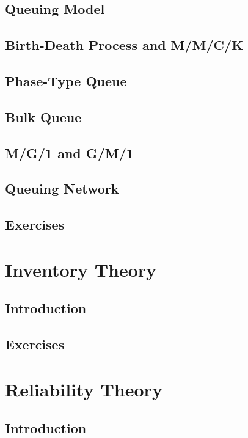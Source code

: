 \documentclass[10pt]{book}
\begin{document}
	\chapter{Queuing Model}

	\chapter{Birth-Death Process and M/M/C/K}

	\chapter{Phase-Type Queue}

	\chapter{Bulk Queue}

	\chapter{M/G/1 and G/M/1}

	\chapter{Queuing Network}

	\chapter{Exercises}

\part{Inventory Theory}
	\chapter{Introduction}

	\chapter{Exercises}

\part{Reliability Theory}
	\chapter{Introduction}
\end{document}
